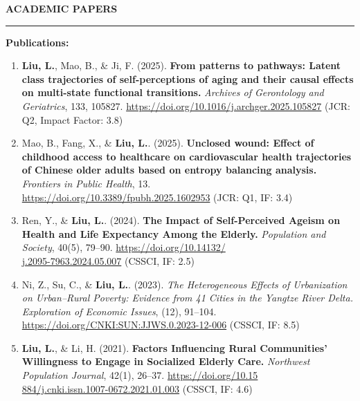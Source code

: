 \documentclass{resume} %
\renewenvironment{rSection}[1]{
\sectionskip
\textcolor{CarnegieMellonRed}{\MakeUppercase{#1}} %
\sectionlineskip
\hrule %
\begin{list}{}{
\setlength{\leftmargin}{1.5em} %
}
\item[]
}{
\end{list}
}
\begin{document}
\begin{rSection}{\bf Academic Papers} \itemsep -2pt
\textbf{Publications:}
\begin{enumerate}   
\item\textbf{Liu, L.}, Mao, B., \& Ji, F. (2025). \textbf{From patterns to pathways: Latent class trajectories of self-perceptions of aging and their causal effects on multi-state functional transitions.} \textit{Archives of Gerontology and Geriatrics}, 133, 105827. \href{https://doi.org/10.1016/j.archger.2025.105827}{https://doi.org/10.1016/j.archger.2025.105827}
\textcolor{RoyalBlueCustom}{(JCR: Q2, Impact Factor: 3.8)}

\item Mao, B.\dag, Fang, X.\dag, \& \textbf{Liu, L.\dag}. (2025). \textbf{Unclosed wound: Effect of childhood access to healthcare on cardiovascular health trajectories of Chinese older adults based on entropy balancing analysis.} \textit{Frontiers in Public Health}, 13. \href{https://doi.org/10.3389/fpubh.2025.1602953}{\\https://doi.org/10.3389/fpubh.2025.1602953}
\textcolor{RoyalBlueCustom}{(JCR: Q1, IF: 3.4)}

\item Ren, Y., \& \textbf{Liu, L.}. (2024). \textbf{The Impact of Self-Perceived Ageism on Health and Life Expectancy Among the Elderly.} \textit{Population and Society}, 40(5), 79–90. \href{https://doi.org/10.14132/j.2095-7963.2024.05.007}{https://doi.org/10.14132/
\\j.2095-7963.2024.05.007} 
\textcolor{RoyalBlueCustom}{(CSSCI, IF: 2.5)}

\item Ni, Z., Su, C., \& \textbf{Liu, L.}. (2023). \textit{The Heterogeneous Effects of Urbanization on Urban–Rural Poverty: Evidence from 41 Cities in the Yangtze River Delta.} \textit{Exploration of Economic Issues}, (12), 91–104. \href{https://doi.org/CNKI:SUN:JJWS.0.2023-12-006}{https://doi.org/CNKI:SUN:JJWS.0.2023-12-006}
\textcolor{RoyalBlueCustom}{(CSSCI, IF: 8.5)}

\item \textbf{Liu, L.}, \& Li, H. (2021). \textbf{Factors Influencing Rural Communities’ Willingness to Engage in Socialized Elderly Care.} \textit{Northwest Population Journal}, 42(1), 26–37. \href{https://doi.org/10.15884/j.cnki.issn.1007-0672.2021.01.003}{https://doi.org/10.15\\
884/j.cnki.issn.1007-0672.2021.01.003}
\textcolor{RoyalBlueCustom}{(CSSCI, IF: 4.6)}


\end{enumerate}
\end{rSection}
\end{document}
